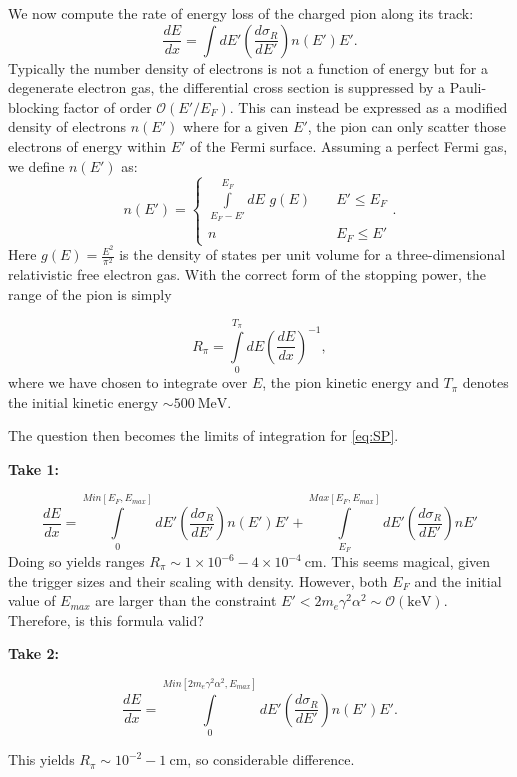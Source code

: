 \documentclass[11 pt, preprint,preprintnumbers,amsmath,amssymb, prd]{revtex4}
\begin{document}
We now compute the rate of energy loss of the charged pion along its track:
\begin{equation}
\label{eq:SP}
\frac{dE}{dx} = \int dE' \left(\frac{d \sigma_R}{dE'}\right) n(E') E'.
\end{equation}
Typically the number density of electrons is not a function of energy but for a degenerate electron gas, the differential cross section is suppressed by a Pauli-blocking factor of order $\mathcal{O}(E'/E_F)$. This can instead be expressed as a modified density of electrons $n(E')$ where for a given $E'$, the pion can only scatter those electrons of energy within $E'$ of the Fermi surface. Assuming a perfect Fermi gas, we define $n(E')$ as:
\begin{equation}
n(E') = \left\{
        \begin{array}{ll}
            \displaystyle \int \limits_{E_F -E'}^{E_F}dE \hspace{4pt} g(E) & \quad E' \leq E_F \\
            n & \quad E_F \leq E'
        \end{array}
    \right..
\end{equation}
Here $g(E) = \frac{E^2}{\pi^2}$ is the density of states per unit volume for a three-dimensional relativistic free electron gas. With the correct form of the stopping power, the range of the pion is simply 

\begin{equation}
R_\pi = \int \limits_{0}^{T_\pi} dE \left(\frac{dE}{dx}\right)^{-1},
\end{equation}
where we have chosen to integrate over $E$, the pion kinetic energy and $T_\pi$ denotes the initial kinetic energy $\sim 500 ~\text{MeV}$. 

The question then becomes the limits of integration for \ref{eq:SP}. 

\textbf{Take 1:}

\begin{equation}
\frac{dE}{dx} = \int \limits_{0}^{Min[E_F, E_{max}]} dE' \left(\frac{d \sigma_R}{dE'}\right) n(E') E' + \int \limits_{E_F}^{Max[E_F, E_{max}]} dE' \left(\frac{d \sigma_R}{dE'}\right) n E' 
\end{equation}
Doing so yields ranges $R_\pi \sim 1 \times 10^{-6} - 4 \times 10^{-4} ~\text{cm}$. This seems magical, given the trigger sizes and their scaling with density. However, both $E_F$ and the initial value of $E_{max}$ are larger than the constraint $E' < 2 m_e \gamma^2 \alpha^2 \sim \mathcal{O}(\text{keV})$. Therefore, is this formula valid?

\textbf{Take 2:}

\begin{equation}
\frac{dE}{dx} = \int \limits_{0}^{Min[2 m_e \gamma^2 \alpha^2, E_{max}]} dE' \left(\frac{d \sigma_R}{dE'}\right) n(E') E'. 
\end{equation}

This yields $R_\pi \sim 10^{-2} - 1 ~\text{cm}$, so considerable difference. 
\end{document}
